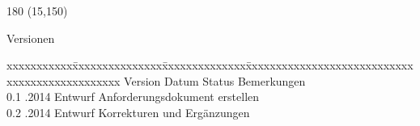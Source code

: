 
\begin{textblock}{180} (15,150)
\color{black}
\begin{huge}
Versionen
\end{huge}
\vspace{10mm}

\fontsize{10pt}{18pt}\selectfont
\begin{tabbing}
xxxxxxxxxxx\=xxxxxxxxxxxxxxx\=xxxxxxxxxxxxxx\=xxxxxxxxxxxxxxxxxxxxxxxxxxxxxxxxxxxxxxxxxxxxxxx \kill
Version	\> Datum	\> Status		\> Bemerkungen		\\
0.1	.2014	\> Entwurf		\> Anforderungsdokument erstellen	\\	
0.2	.2014	\> Entwurf		\> Korrekturen und Ergänzungen	\\	
\end{tabbing}

\end{textblock}
